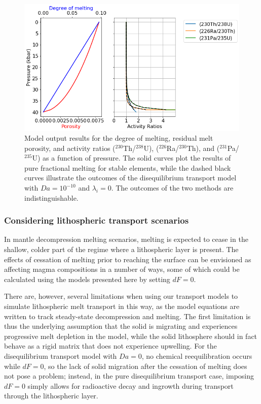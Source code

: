 \documentclass[draft]{agujournal2019}
\begin{document}
\begin{figure}[H]
	\noindent\includegraphics[width=\textwidth]{Figure_7.png}
	\caption{Model output results for the degree of melting, residual melt porosity, and activity ratios ($^{230}$Th/$^{238}$U), ($^{226}$Ra/$^{230}$Th), and ($^{231}$Pa/$^{235}$U) as a function of pressure. The solid curves plot the results of pure fractional melting for stable elements, while the dashed black curves illustrate the outcomes of the disequilibrium transport model with $Da=10^{-10}$ and $\lambda_i=0$. The outcomes of the two methods are indistinguishable.}
	\label{output-fractional}
\end{figure}


\subsubsection{Considering lithospheric transport scenarios}

In mantle decompression melting scenarios, melting is expected to cease in the shallow, colder part of the regime where a lithospheric layer is present. The effects of cessation of melting prior to reaching the surface can be envisioned as affecting magma compositions in a number of ways, some of which could be calculated using the models presented here by setting $dF=0$.

There are, however, several limitations when using our transport models to simulate lithospheric melt transport in this way, as the model equations are written to track steady-state decompression and melting. The first limitation is thus the underlying assumption that the solid is migrating and experiences progressive melt depletion in the model, while the solid lithosphere should in fact behave as a rigid matrix that does not experience upwelling. For the disequilibrium transport model with $Da=0$, no chemical reequilibration occurs while $dF=0$, so the lack of solid migration after the cessation of melting does not pose a problem; instead, in the pure disequilibrium transport case, imposing $dF=0$ simply allows for radioactive decay and ingrowth during transport through the lithospheric layer.
\end{document}
